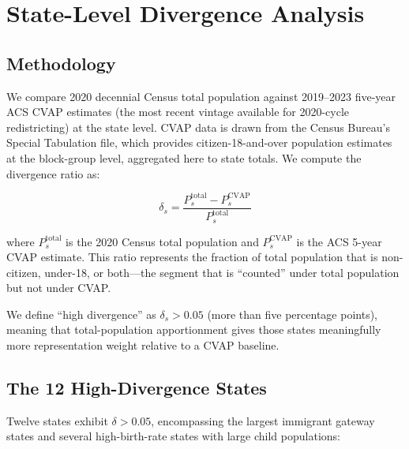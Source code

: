 \section{State-Level Divergence Analysis}
\label{sec:divergence}

\subsection{Methodology}

We compare 2020 decennial Census total population against 2019--2023 five-year ACS CVAP estimates (the most recent vintage available for 2020-cycle redistricting) at the state level. CVAP data is drawn from the Census Bureau's Special Tabulation file, which provides citizen-18-and-over population estimates at the block-group level, aggregated here to state totals. We compute the divergence ratio as:

\[
\delta_s = \frac{P_s^{\text{total}} - P_s^{\text{CVAP}}}{P_s^{\text{total}}}
\]

where $P_s^{\text{total}}$ is the 2020 Census total population and $P_s^{\text{CVAP}}$ is the ACS 5-year CVAP estimate. This ratio represents the fraction of total population that is non-citizen, under-18, or both---the segment that is ``counted'' under total population but not under CVAP.

We define ``high divergence'' as $\delta_s > 0.05$ (more than five percentage points), meaning that total-population apportionment gives those states meaningfully more representation weight relative to a CVAP baseline.

\subsection{The 12 High-Divergence States}

Twelve states exhibit $\delta > 0.05$, encompassing the largest immigrant gateway states and several high-birth-rate states with large child populations:

